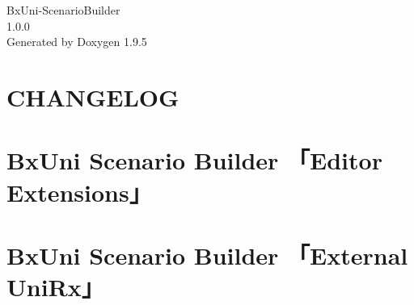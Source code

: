 \documentclass[twoside]{book}
\newcommand{\+}{\discretionary{\mbox{\scriptsize$\hookleftarrow$}}{}{}}
\newcommand{\clearemptydoublepage}{%
    \newpage{\pagestyle{empty}\cleardoublepage}%
  }
\begin{document}
  \raggedbottom
  \begin{CJK}{UTF8}{min}
    \hypersetup{pageanchor=false,
                bookmarksnumbered=true,
                pdfencoding=unicode
               }
  \begin{titlepage}
  \vspace*{7cm}
  \begin{center}%
  {\Large Bx\+Uni-\/\+Scenario\+Builder}\\
  [1ex]\large 1.\+0.\+0 \\
  \vspace*{1cm}
  {\large Generated by Doxygen 1.9.5}\\
  \end{center}
  \end{titlepage}
  \clearemptydoublepage
  \tableofcontents
  \clearemptydoublepage
  \hypersetup{pageanchor=true}
\chapter{CHANGELOG}
\label{md__c__home_murakami__b_x_tools__github__bx_uni__scenario_builder__packages__bx_uni__scenario_builder__c_h_a_n_g_e_l_o_g}

\chapter{Bx\+Uni Scenario Builder 「\+Editor Extensions」}
\label{md__c__home_murakami__b_x_tools__github__bx_uni__scenario_builder__packages__bx_uni__scenario_bub2685b0606fbbeed66797c7b65568041}

\chapter{Bx\+Uni Scenario Builder 「\+External Uni\+Rx」}
\label{md__c__home_murakami__b_x_tools__github__bx_uni__scenario_builder__packages__bx_uni__scenario_bue3212159582c06f3ebc9cdd3108a7da1}


\end{CJK}
\end{document}
